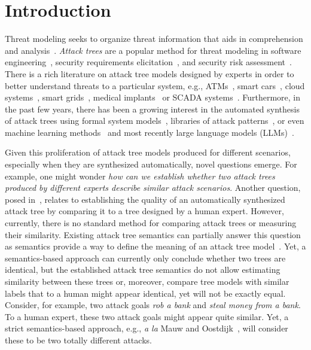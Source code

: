 

\section{Introduction}
\label{sec:introduction}

Threat modeling seeks to organize threat information that aids in comprehension and analysis~\cite{andersonSecurityEngineeringGuide2020,schneierSecretsLiesDigital2000}. \emph{Attack trees} are a popular method for threat modeling in software engineering~\cite{shostack2014threat,tarandach2020threat}, security requirements elicitation~\cite{rashid2016discovering,mai2018modeling}, and security risk assessment~\cite{ingoldsby2010attack,paul2014unifying}. There is a rich literature on attack tree models designed by experts in order to better understand threats to a particular system, e.g., ATMs~\cite{fraile2016using}, smart cars~\cite{kong2018security,ren2011novel}, cloud systems~\cite{wang2012threat,duncan2019combined}, smart grids~\cite{beckers2014determining,mclaughlin2010energy}, medical implants~\cite{siddiqi2018attack} or SCADA systems~\cite{ten2007vulnerability}. Furthermore, in the past few years, there has been a growing interest in the automated synthesis of attack trees using formal system models~\cite{widel2019beyond,ivanova2015attack,vigo2014automated,pinchinat2015atsyra,gadyatskayaRefinementAwareGenerationAttack2017}, libraries of attack patterns~\cite{jhawar2018semi,bryans2020template}, or even machine learning methods~\cite{sowka2021towards} and most recently large language models (LLMs)~\cite{gadyatskaya2023chatgpt}.

Given this proliferation of attack tree models produced for different scenarios, especially when they are synthesized automatically, novel questions emerge. For example, one might wonder \emph{how can we establish whether two attack trees produced by different experts describe similar attack scenarios}. 
Another question, posed in~\cite{gadyatskaya2023chatgpt}, relates to establishing the quality of an automatically synthesized attack tree by comparing it to a tree designed by a human expert. However, currently, there is no standard method for comparing attack trees or measuring their similarity. Existing attack tree semantics can partially answer this question as semantics provide a way to define the meaning of an attack tree model~\cite{mauwFoundationsAttackTrees2006}. Yet, a semantics-based approach can currently only conclude whether two trees are identical, but the established attack tree semantics do not allow estimating similarity between these trees or, moreover, compare tree models with similar labels that to a human might appear identical, yet will not be exactly equal. Consider, for example, two attack goals \emph{rob a bank} and \emph{steal money from a bank}. To a human expert, these two attack goals might appear quite similar. Yet, a strict semantics-based approach, e.g., \emph{a la} Mauw and Oostdijk~\cite{mauwFoundationsAttackTrees2006}, will consider these to be two totally different attacks.  %

